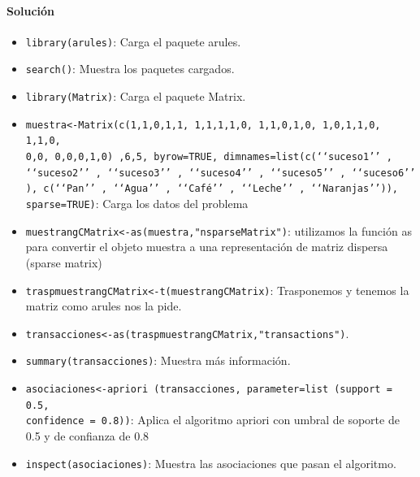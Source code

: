 \documentclass[a4paper, 12pt]{article}
\begin{document}
	\paragraph{Solución}
	\begin{itemize}
		\item \texttt{library(arules)}: Carga el paquete arules.
		\item \texttt{search()}: Muestra los paquetes cargados.
		\item \texttt{library(Matrix)}: Carga el paquete Matrix.
		\item \texttt{muestra<-Matrix(c(1,1,0,1,1, 1,1,1,1,0, 1,1,0,1,0, 1,0,1,1,0, 1,1,0,\\0,0, 0,0,0,1,0) ,6,5, byrow=TRUE, dimnames=list(c(‘‘suceso1’’ , ‘‘suceso2’’ , ‘‘suceso3’’ , ‘‘suceso4’’ , ‘‘suceso5’’ , ‘‘suceso6’’ ), c(‘‘Pan’’ , ‘‘Agua’’ , ‘‘Café’’ , ‘‘Leche’’ , ‘‘Naranjas’’)), sparse=TRUE)}: Carga los datos del problema
		\item \texttt{muestrangCMatrix<-as(muestra,"nsparseMatrix")}: utilizamos la función as para convertir el objeto muestra a una representación de matriz dispersa (sparse matrix)
		\item \texttt{traspmuestrangCMatrix<-t(muestrangCMatrix)}: Trasponemos y tenemos la matriz como arules nos la pide.
		\item \texttt{transacciones<-as(traspmuestrangCMatrix,"transactions")}.
		\item \texttt{summary(transacciones)}: Muestra más información.
		\item \texttt{asociaciones<-apriori (transacciones, parameter=list (support = 0.5, \\confidence = 0.8))}: Aplica el algoritmo apriori con umbral de soporte de 0.5 y de confianza de 0.8
		\item \texttt{inspect(asociaciones)}: Muestra las asociaciones que pasan el algoritmo.
	\end{itemize}
\end{document}
